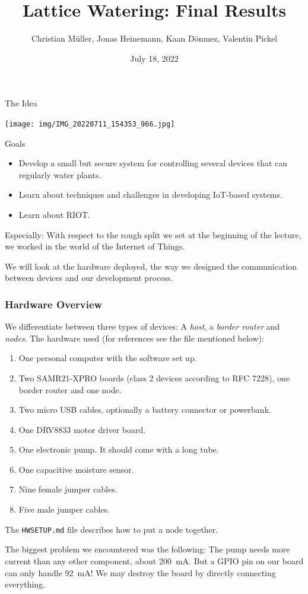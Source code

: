 \documentclass[10pt, xcolor=svgnames]{beamer}
\title{Lattice Watering: Final Results}
\author{Christian Müller, Jonas Heinemann, Kaan Dönmez, Valentin Pickel}
\institute{
    Software Project on Internet Communication

    Summer Term 2022
    
    Freie Universität Berlin

    Institute for Computer Science
}
\date{July 18, 2022}
\begin{document}
\maketitle

\begin{frame}{The Idea}

    \texttt{[image: img/IMG\_20220711\_154353\_966.jpg]}

\end{frame}

\begin{frame}{Goals}

    \begin{itemize}
        \item Develop a small but secure system for controlling several devices that can regularly water plants.
        \item Learn about techniques and challenges in developing IoT-based systems.
        \item Learn about RIOT.
    \end{itemize}

    Especially: With respect to the rough split we set at the beginning of the lecture, we worked in the world of the Internet of Things.

    \phantom{}

    We will look at the hardware deployed, the way we designed the communication between devices and our development process.
\end{frame}

\begin{frame}
    \frametitle{Hardware Overview}

    We differentiate between three types of devices: A \emph{host}, a \emph{border router} and \emph{nodes}. The hardware used (for references see the file mentioned below):

    \begin{enumerate}
        \item One personal computer with the software set up.
        \item Two SAMR21-XPRO boards (class 2 devices according to RFC 7228), one border router and one node.
        \item Two micro USB cables, optionally a battery connector or powerbank.
        \item One DRV8833 motor driver board.
        \item One electronic pump. It should come with a long tube.
        \item One capacitive moisture sensor.
        \item Nine female jumper cables.
        \item Five male jumper cables.
    \end{enumerate}

    The \texttt{HWSETUP.md} file describes how to put a node together.    

    The biggest problem we encountered was the following: The pump needs more current than any other component, about \qty{200}{\milli\ampere}. But a GPIO pin on our board can only handle \qty{92}{\milli\ampere}! We may destroy the board by directly connecting everything.
\end{frame}
\end{document}
